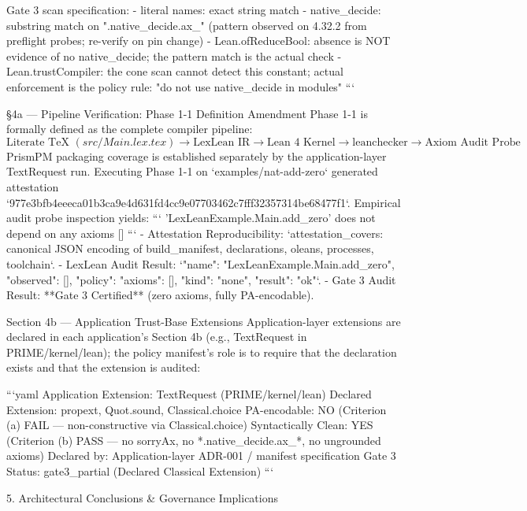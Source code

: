 Gate 3 scan specification:
  - literal names: exact string match
  - native_decide: substring match on ".native_decide.ax_" (pattern observed on 4.32.2 from preflight probes; re-verify on pin change)
  - Lean.ofReduceBool: absence is NOT evidence of no native_decide; the pattern match is the actual check
  - Lean.trustCompiler: the cone scan cannot detect this constant; actual enforcement is the policy rule: "do not use native_decide in \noaxioms modules"
```

§4a — Pipeline Verification: Phase 1-1 Definition Amendment
Phase 1-1 is formally defined as the complete compiler pipeline:
$$\text{Literate TeX } (src/Main.lex.tex) \longrightarrow \text{LexLean IR} \longrightarrow \text{Lean 4 Kernel} \longrightarrow \text{leanchecker} \longrightarrow \text{Axiom Audit Probe}$$
PrismPM packaging coverage is established separately by the application-layer TextRequest run.
Executing Phase 1-1 on `examples/nat-add-zero` generated attestation `977e3bfb4eeeca01b3ca9e4d631fd4cc9e07703462c7fff32357314be68477f1`.
Empirical audit probe inspection yields:
```
'LexLeanExample.Main.add_zero' does not depend on any axioms []
```
- Attestation Reproducibility: `attestation_covers: canonical JSON encoding of {build_manifest, declarations, oleans, processes, toolchain}`.
- LexLean Audit Result: `{"name": "LexLeanExample.Main.add_zero", "observed": [], "policy": {"axioms": [], "kind": "none"}, "result": "ok"}`.
- Gate 3 Audit Result: **Gate 3 Certified** (zero axioms, fully PA-encodable).

Section 4b — Application Trust-Base Extensions
Application-layer extensions are declared in each application's Section 4b (e.g., TextRequest in PRIME/kernel/lean); the policy manifest's role is to require that the declaration exists and that the extension is audited:

```yaml
Application Extension: TextRequest (PRIME/kernel/lean)
Declared Extension: {propext, Quot.sound, Classical.choice}
PA-encodable: NO (Criterion (a) FAIL — non-constructive via Classical.choice)
Syntactically Clean: YES (Criterion (b) PASS — no sorryAx, no *.native_decide.ax_*, no ungrounded axioms)
Declared by: Application-layer ADR-001 / manifest specification
Gate 3 Status: gate3_partial (Declared Classical Extension)
```

5. Architectural Conclusions & Governance Implications

